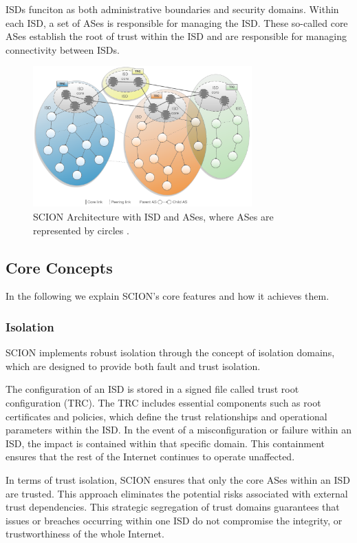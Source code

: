 ISDs funciton as both administrative boundaries and security domains.
Within each ISD, a set of ASes is responsible for managing the ISD.
These so-called core ASes establish the root of trust within the ISD and are responsible for managing connectivity between ISDs.

\begin{figure}[h]
    \centering
    \includegraphics[width=0.75\textwidth]{figures/scion_isd_architecture.png}
    \caption{SCION Architecture with ISD and ASes, where ASes are represented by circles \cite[Chapter 2]{Perrig2022}.}
    \label{fig:scion_isd_architecture}
\end{figure}


\subsection{Core Concepts}
In the following we explain SCION's core features and how it achieves them.
\subsubsection{Isolation}

SCION implements robust isolation through the concept of isolation domains, which are designed to provide both fault and trust isolation.

The configuration of an ISD is stored in a signed file called trust root configuration (TRC).
The TRC includes essential components such as root certificates and policies, which define the trust relationships and operational parameters within the ISD.
In the event of a misconfiguration or failure within an ISD, the impact is contained within that specific domain.
This containment ensures that the rest of the Internet continues to operate unaffected.

In terms of trust isolation, SCION ensures that only the core ASes within an ISD are trusted.
This approach eliminates the potential risks associated with external trust dependencies.
This strategic segregation of trust domains guarantees that issues or breaches occurring within one ISD do not compromise the integrity, or trustworthiness of the whole Internet.


